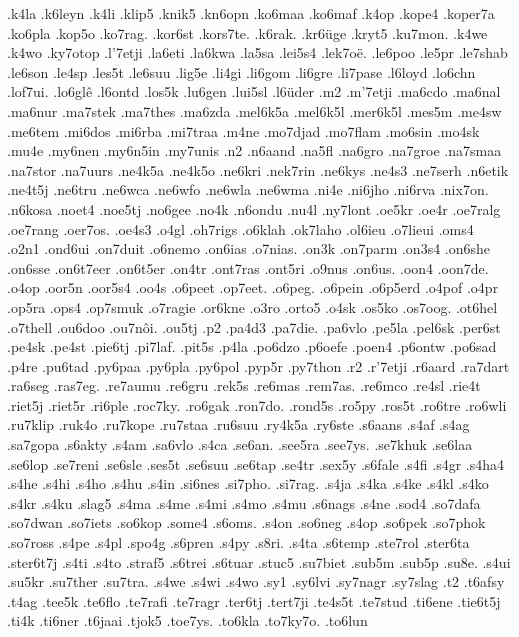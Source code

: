 .k4la
.k6leyn
.k4li
.klip5
.knik5
.kn6opn
.ko6maa
.ko6maf
.k4op
.kope4
.koper7a
.ko6pla
.kop5o
.ko7rag.
.kor6st
.kors7te.
.k6rak.
.kr6üge
.kryt5
.ku7mon.
.k4we
.k4wo
.ky7otop
.l'7etji
.la6eti
.la6kwa
.la5sa
.lei5s4
.lek7oë.
.le6poo
.le5pr
.le7shab
.le6son
.le4sp
.les5t
.le6suu
.lig5e
.li4gi
.li6gom
.li6gre
.li7pase
.l6loyd
.lo6chn
.lof7ui.
.lo6glê
.l6ontd
.los5k
.lu6gen
.lui5sl
.l6üder
.m2
.m'7etji
.ma6cdo
.ma6nal
.ma6nur
.ma7stek
.ma7thes
.ma6zda
.mel6k5a
.mel6k5l
.mer6k5l
.mes5m
.me4sw
.me6tem
.mi6dos
.mi6rba
.mi7traa
.m4ne
.mo7djad
.mo7flam
.mo6sin
.mo4sk
.mu4e
.my6nen
.my6n5in
.my7unis
.n2
.n6aand
.na5fl
.na6gro
.na7groe
.na7smaa
.na7stor
.na7uurs
.ne4k5a
.ne4k5o
.ne6kri
.nek7rin
.ne6kys
.ne4s3
.ne7serh
.n6etik
.ne4t5j
.ne6tru
.ne6wca
.ne6wfo
.ne6wla
.ne6wma
.ni4e
.ni6jho
.ni6rva
.nix7on.
.n6kosa
.noet4
.noe5tj
.no6gee
.no4k
.n6ondu
.nu4l
.ny7lont
.oe5kr
.oe4r
.oe7ralg
.oe7rang
.oer7os.
.oe4s3
.o4gl
.oh7rigs
.o6klah
.ok7laho
.ol6ieu
.o7lieui
.oms4
.o2n1
.ond6ui
.on7duit
.o6nemo
.on6ias
.o7nias.
.on3k
.on7parm
.on3s4
.on6she
.on6sse
.on6t7eer
.on6t5er
.on4tr
.ont7ras
.ont5ri
.o9nus
.on6us.
.oon4
.oon7de.
.o4op
.oor5n
.oor5s4
.oo4s
.o6peet
.op7eet.
.o6peg.
.o6pein
.o6p5erd
.o4pof
.o4pr
.op5ra
.ops4
.op7smuk
.o7ragie
.or6kne
.o3ro
.orto5
.o4sk
.os5ko
.os7oog.
.ot6hel
.o7thell
.ou6doo
.ou7nôi.
.ou5tj
.p2
.pa4d3
.pa7die.
.pa6vlo
.pe5la
.pel6sk
.per6st
.pe4sk
.pe4st
.pie6tj
.pi7laf.
.pit5s
.p4la
.po6dzo
.p6oefe
.poen4
.p6ontw
.po6sad
.p4re
.pu6tad
.py6paa
.py6pla
.py6pol
.pyp5r
.py7thon
.r2
.r'7etji
.r6aard
.ra7dart
.ra6seg
.ras7eg.
.re7aumu
.re6gru
.rek5s
.re6mas
.rem7as.
.re6mco
.re4sl
.rie4t
.riet5j
.riet5r
.ri6ple
.roc7ky.
.ro6gak
.ron7do.
.rond5s
.ro5py
.ros5t
.ro6tre
.ro6wli
.ru7klip
.ruk4o
.ru7kope
.ru7staa
.ru6suu
.ry4k5a
.ry6ste
.s6aans
.s4af
.s4ag
.sa7gopa
.s6akty
.s4am
.sa6vlo
.s4ca
.se6an.
.see5ra
.see7ys.
.se7khuk
.se6laa
.se6lop
.se7reni
.se6sle
.ses5t
.se6suu
.se6tap
.se4tr
.sex5y
.s6fale
.s4fi
.s4gr
.s4ha4
.s4he
.s4hi
.s4ho
.s4hu
.s4in
.si6nes
.si7pho.
.si7rag.
.s4ja
.s4ka
.s4ke
.s4kl
.s4ko
.s4kr
.s4ku
.slag5
.s4ma
.s4me
.s4mi
.s4mo
.s4mu
.s6nags
.s4ne
.sod4
.so7dafa
.so7dwan
.so7iets
.so6kop
.some4
.s6oms.
.s4on
.so6neg
.s4op
.so6pek
.so7phok
.so7ross
.s4pe
.s4pl
.spo4g
.s6pren
.s4py
.s8ri.
.s4ta
.s6temp
.ste7rol
.ster6ta
.ster6t7j
.s4ti
.s4to
.straf5
.s6trei
.s6tuar
.stuc5
.su7biet
.sub5m
.sub5p
.su8e.
.s4ui
.su5kr
.su7ther
.su7tra.
.s4we
.s4wi
.s4wo
.sy1
.sy6lvi
.sy7nagr
.sy7slag
.t2
.t6afsy
.t4ag
.tee5k
.te6flo
.te7rafi
.te7ragr
.ter6tj
.tert7ji
.te4s5t
.te7stud
.ti6ene
.tie6t5j
.ti4k
.ti6ner
.t6jaai
.tjok5
.toe7ys.
.to6kla
.to7ky7o.
.to6lun
